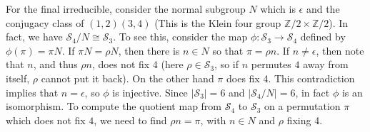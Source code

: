 \documentclass{amsart}
\newcommand{\ZZ}{\mathbb{Z}}
\renewcommand{\S}{\mathcal{S}}
\begin{document}
\begin{enumerate}
     For the final irreducible, consider the normal subgroup $N$ which is
     $\epsilon$ and the conjugacy class of $(1,2)(3,4)$ (This is the
     Klein four group $\ZZ/2 \times \ZZ/2$).  In fact, we have
     $\S_4 / N \cong \S_3$.  To see this, consider the map $\phi:\S_3 \to \S_4$
     defined by $\phi(\pi) = \pi N$.  If $\pi N = \rho N$, then there is $n \in N$ so that $\pi = \rho n$.  If $n \ne \epsilon$, then note that $n$, and thus $\rho n$, does not fix 4 (here $\rho \in \S_3$, so if $n$ permutes $4$ away from itself, $\rho$ cannot put it back).  On the other hand $\pi$ does fix 4.  This contradiction implies that $n = \epsilon$, so $\phi$ is injective.  Since $|\S_3| = 6$ and $|\S_4/N| = 6$, in fact $\phi$ is an isomorphism.  To compute the quotient map from $\S_4$ to $\S_3$ on a permutation $\pi$ which does not fix $4$, we need to find $\rho n = \pi$, with $n \in N$ and $\rho$ fixing 4.


\end{enumerate}
\end{document}
